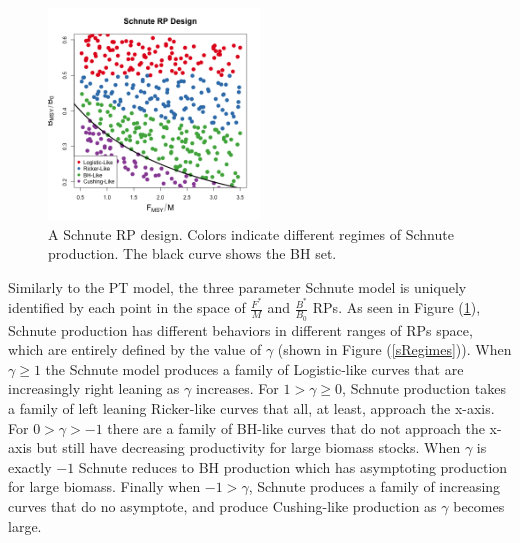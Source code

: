 \documentclass[12pt]{article}
\begin{document}

%
\begin{figure}
\vspace{-0.5cm}
\includegraphics[width=0.5\textwidth]{../gpBias/designLineColorHHardFlatT30N150WWideN112.png}
\vspace{-1cm}
\caption{
A Schnute RP design. %
Colors indicate different regimes of Schnute production. %
The black curve shows the BH set.
}
\label{colorDes}
\end{figure}

%
Similarly to the PT model, the three parameter Schnute model is uniquely 
identified by each point in the space of $\frac{F^*}{M}$ 
and $\frac{B^*}{B_0}$ RPs. As seen in Figure (\ref{colorDes}), Schnute 
production has different behaviors in different ranges of RPs space, which 
are entirely defined by the value of $\gamma$ (shown in Figure (\ref{sRegimes})). 
When $\gamma\ge1$ the Schnute model produces a family of Logistic-like curves that are 
increasingly right leaning as $\gamma$ increases. 
For $1>\gamma\ge0$, Schnute production takes a family of left leaning Ricker-like curves 
that all, at least, approach the x-axis. For $0>\gamma>-1$ there are a family of BH-like 
curves that do not approach the x-axis but still have decreasing productivity for large
biomass stocks. When $\gamma$ is exactly $-1$ Schnute reduces to BH production which has 
asymptoting production for large biomass. Finally when $-1>\gamma$, Schnute 
produces a family of increasing curves that do no asymptote, and produce 
Cushing-like production as $\gamma$ becomes large.
\end{document}
